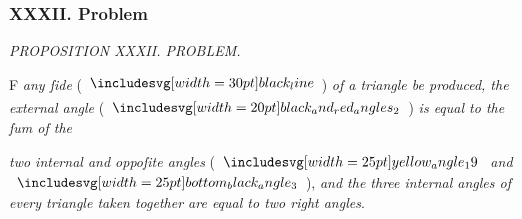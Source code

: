 \documentclass[11pt,preview]{standalone}
\begin{document}
\subsubsection{XXXII. Problem}

\begin{minipage}[t]{0.55\textwidth}
    \begin{center}
        \textit{PROPOSITION XXXII. PROBLEM.}\label{book1pr32} \\
    \end{center}

    \hfill

    \begin{center}
        \raggedright \lettrine[lines=3, loversize=1, nindent=0pt]{}{}F \textit{any ſide} (\hspace{-1ex}$\blackline$\hspace{-1ex}) \textit{of a triangle be produced, the external angle} (\hspace{-1ex}$\img[0][0][20]{black_and_red_angles_2}$\hspace{-1ex}) \textit{is equal to the ſum of the}
    \end{center}
    \raggedright \textit{two internal and oppoſite angles} (\hspace{-1ex}$\img{yellow_angle_19}$ \textit{and} $\img{bottom_black_angle_3}$\hspace{-1ex}), \textit{and the three internal angles of every triangle taken together are equal to two right angles}.
\end{minipage}%
\hfill
\begin{minipage}[t]{0.43\textwidth}
    \vspace{20pt}
    
\end{minipage}

\hfill
\end{document}
